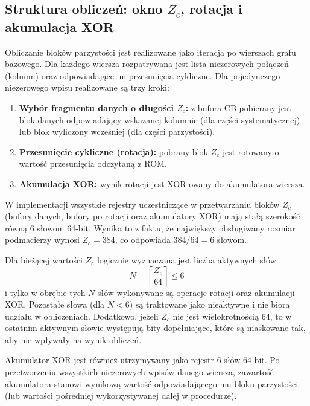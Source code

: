 
\subsection{Struktura obliczeń: okno $Z_c$, rotacja i akumulacja XOR}
\label{subsec:ldpc_enc_window_rotate_xor}

Obliczanie bloków parzystości jest realizowane jako iteracja po wierszach grafu bazowego. Dla każdego wiersza rozpatrywana jest lista niezerowych połączeń (kolumn) oraz odpowiadające im przesunięcia cykliczne. Dla pojedynczego niezerowego wpisu realizowane są trzy kroki:
\begin{enumerate}
    \item \textbf{Wybór fragmentu danych o długości $Z_c$:} z bufora CB pobierany jest blok danych odpowiadający wskazanej kolumnie (dla części systematycznej) lub blok wyliczony wcześniej (dla części parzystości).
    \item \textbf{Przesunięcie cykliczne (rotacja):} pobrany blok $Z_c$ jest rotowany o wartość przesunięcia odczytaną z ROM.
    \item \textbf{Akumulacja XOR:} wynik rotacji jest XOR-owany do akumulatora wiersza.
\end{enumerate}

W implementacji wszystkie rejestry uczestniczące w przetwarzaniu bloków $Z_c$ (bufory danych, bufory po rotacji oraz akumulatory XOR) mają stałą szerokość równą 6 słowom 64-bit. Wynika to z faktu, że największy obsługiwany rozmiar podmacierzy wynosi $Z_c=384$, co odpowiada $384/64 = 6$ słowom.

Dla bieżącej wartości $Z_c$ logicznie wyznaczana jest liczba aktywnych słów:
\[
N = \left\lceil \frac{Z_c}{64} \right\rceil \le 6
\]
i tylko w obrębie tych $N$ słów wykonywane są operacje rotacji oraz akumulacji XOR. Pozostałe słowa (dla $N<6$) są traktowane jako nieaktywne i nie biorą udziału w obliczeniach.
Dodatkowo, jeżeli $Z_c$ nie jest wielokrotnością 64, to w ostatnim aktywnym słowie występują bity dopełniające, które są maskowane tak, aby nie wpływały na wynik obliczeń.


Akumulator XOR jest również utrzymywany jako rejestr $6$ słów 64-bit. Po przetworzeniu wszystkich niezerowych wpisów danego wiersza, zawartość akumulatora stanowi wynikową wartość odpowiadającego mu bloku parzystości (lub wartości pośredniej wykorzystywanej dalej w procedurze).


